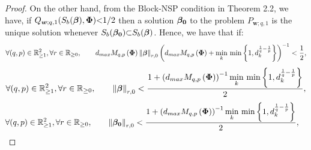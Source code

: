 \begin{proof}
{On the other hand, from the Block-NSP condition in Theorem 2.2, we have, if $Q_{\boldsymbol{w};q,1}(S_b(\boldsymbol{\beta}),\boldsymbol{\Phi}) {<} 1/2$ then a solution $\boldsymbol{\beta_0}$ to the problem $P_{\boldsymbol{w};q,1}$ is the unique solution whenever $S_b(\boldsymbol{\beta_0}) {{\subset}} S_b(\boldsymbol{\beta})$.
Hence, we have that if:}
\begin{gather*}  
\forall (q,p) \in \mathbb{R}^2_{\geq 1}, \forall r \in \mathbb{R}_{\geq 0}, \qquad
d_{max} M_{q,p}\left( \boldsymbol{\Phi} \right) \left\lVert\boldsymbol{\beta}\right\rVert_{r,0} \left( d_{max} M_{q,p}\left( \boldsymbol{\Phi} \right) + \min_{k} \, \min \left\lbrace 1 , d_k^{\frac1q - \frac1p} \right\rbrace \right)^{-1} < \frac12,
\end{gather*}
\begin{gather*} 
\begin{aligned} 
\forall (q,p) \in \mathbb{R}^2_{\geq 1}, \forall r \in \mathbb{R}_{\geq 0}, \qquad
\left\lVert\boldsymbol{\beta}\right\rVert_{r,0} &<
\frac{1 + \left( d_{max} M_{q,p}\left( \boldsymbol{\Phi} \right) \right)^{-1} \displaystyle\min_{k} \, \min \left\lbrace 1 , d_k^{\frac1q - \frac1p} \right\rbrace}{2}, \\
\end{aligned}
\end{gather*}
\begin{gather*} 
\begin{aligned} 
\forall (q,p) \in \mathbb{R}^2_{\geq 1}, \forall r \in \mathbb{R}_{\geq 0}, \qquad
\left\lVert\boldsymbol{\beta_0}\right\rVert_{r,0} &<
\frac{1 + \left( d_{max} M_{q,p}\left( \boldsymbol{\Phi} \right) \right)^{-1} \displaystyle\min_{k} \, \min \left\lbrace 1 , d_k^{\frac1q - \frac1p} \right\rbrace}{2},
\end{aligned}
\end{gather*}
\end{proof}